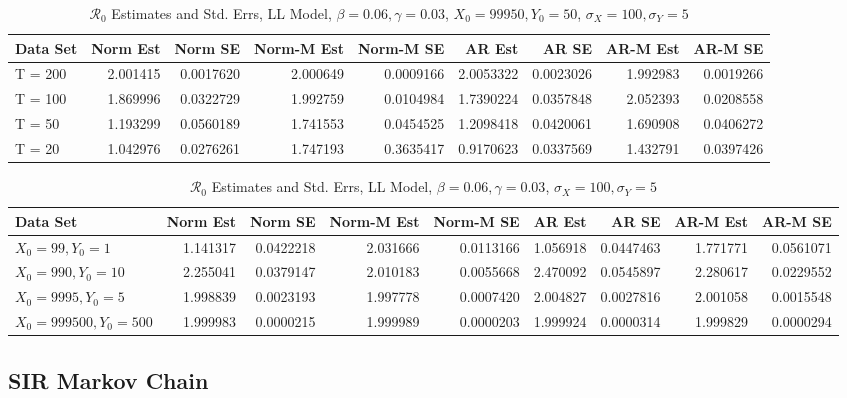 \documentclass[12pt]{article}
\newcommand{\rr}{\ensuremath{\mathcal{R}_0}}
\begin{document}
\begin{table}[H]
	
	\caption{\label{tab:}$\rr$ Estimates and Std. Errs, LL Model,
		$\beta = 0.06, \gamma = 0.03$, $X_0 = 99950, Y_0 = 50$, $\sigma_X = 100, \sigma_Y = 5$}
	\centering
	\begin{tabular}[t]{l|r|r|r|r|r|r|r|r}
		\hline
		Data Set & Norm Est & Norm SE & Norm-M Est & Norm-M SE & AR Est & AR SE & AR-M Est & AR-M SE\\
		\hline
		T = 200 & 2.001415 & 0.0017620 & 2.000649 & 0.0009166 & 2.0053322 & 0.0023026 & 1.992983 & 0.0019266\\
		\hline
		T = 100 & 1.869996 & 0.0322729 & 1.992759 & 0.0104984 & 1.7390224 & 0.0357848 & 2.052393 & 0.0208558\\
		\hline
		T = 50 & 1.193299 & 0.0560189 & 1.741553 & 0.0454525 & 1.2098418 & 0.0420061 & 1.690908 & 0.0406272\\
		\hline
		T = 20 & 1.042976 & 0.0276261 & 1.747193 & 0.3635417 & 0.9170623 & 0.0337569 & 1.432791 & 0.0397426\\
		\hline
	\end{tabular}
\end{table}

\begin{table}[H]
	
	\caption{\label{tab:}$\rr$ Estimates and Std. Errs, LL Model,
		$\beta = 0.06, \gamma = 0.03$, $\sigma_X = 100, \sigma_Y = 5$}
	\centering
	\begin{tabular}[t]{l|r|r|r|r|r|r|r|r}
		\hline
		Data Set & Norm Est & Norm SE & Norm-M Est & Norm-M SE & AR Est & AR SE & AR-M Est & AR-M SE\\
		\hline
		$X_0 = 99, Y_0 = 1$ & 1.141317 & 0.0422218 & 2.031666 & 0.0113166 & 1.056918 & 0.0447463 & 1.771771 & 0.0561071\\
		\hline
		$X_0 = 990, Y_0 = 10$ & 2.255041 & 0.0379147 & 2.010183 & 0.0055668 & 2.470092 & 0.0545897 & 2.280617 & 0.0229552\\
		\hline
		$X_0 = 9995, Y_0 = 5$ & 1.998839 & 0.0023193 & 1.997778 & 0.0007420 & 2.004827 & 0.0027816 & 2.001058 & 0.0015548\\
		\hline
		$X_0 = 999500, Y_0 = 500$ & 1.999983 & 0.0000215 & 1.999989 & 0.0000203 & 1.999924 & 0.0000314 & 1.999829 & 0.0000294\\
		\hline
	\end{tabular}
\end{table}

\subsection{SIR Markov Chain}
\end{document}
